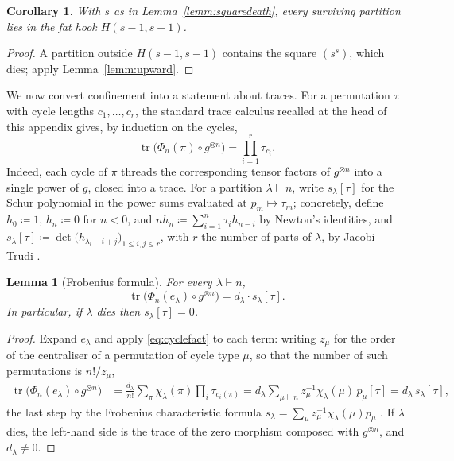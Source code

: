 \documentclass[11pt]{article}
\newtheorem{lemm}[theo]{Lemma}
\newtheorem{coro}[theo]{Corollary}
\newcommand{\tr}{\operatorname{tr}}
\newcommand{\hook}[2]{H(#1,#2)}                   %
\begin{document}
\begin{coro}\label{coro:hookconfine}
With $s$ as in Lemma~\ref{lemm:squaredeath}, every surviving
partition lies in the fat hook $\hook{s-1}{s-1}$.
\end{coro}

\begin{proof}
A partition outside $\hook{s-1}{s-1}$ contains the square
$(s^{s})$, which dies; apply Lemma~\ref{lemm:upward}.
\end{proof}

We now convert confinement into a statement about traces. For a
permutation $\pi$ with cycle lengths $c_{1},\dotsc,c_{r}$, the
standard trace calculus recalled at the head of this appendix
gives, by induction on the cycles,
\begin{equation}\label{eq:cyclefact}
\tr\bigl(\Phi_{n}(\pi)\circ g^{\otimes n}\bigr)
=\prod_{i=1}^{r}\tau_{c_{i}} .
\end{equation}
Indeed, each cycle of $\pi$ threads the corresponding tensor
factors of $g^{\otimes n}$ into a single power of $g$, closed
into a trace.
For a partition $\lambda\vdash n$, write $s_{\lambda}[\tau]$ for
the Schur polynomial in the power sums evaluated at
$p_{m}\mapsto\tau_{m}$; concretely, define
$h_{0}\coloneqq1$, $h_{n}\coloneqq0$ for $n<0$, and
$nh_{n}\coloneqq\sum_{i=1}^{n}\tau_{i}h_{n-i}$ by Newton's
identities, and
$s_{\lambda}[\tau]\coloneqq
\det\bigl(h_{\lambda_{i}-i+j}\bigr)_{1\le i,j\le r}$, with $r$
the number of parts of $\lambda$, by Jacobi--Trudi
\cite[Chapter~I]{Mac95}.

\begin{lemm}[Frobenius formula]\label{lemm:frobenius}
For every $\lambda\vdash n$,
\[
\tr\bigl(\Phi_{n}(e_{\lambda})\circ g^{\otimes n}\bigr)
=d_{\lambda}\cdot s_{\lambda}[\tau].
\]
In particular, if $\lambda$ dies then $s_{\lambda}[\tau]=0$.
\end{lemm}

\begin{proof}
Expand $e_{\lambda}$ and apply \eqref{eq:cyclefact} to each term:
writing $z_{\mu}$ for the order of the centraliser of a
permutation of cycle type $\mu$, so that the number of such
permutations is $n!/z_{\mu}$,
\begin{align*}
\tr\bigl(\Phi_{n}(e_{\lambda})\circ g^{\otimes n}\bigr)
&=\frac{d_{\lambda}}{n!}\sum_{\pi}\chi_{\lambda}(\pi)
  \prod_{i}\tau_{c_{i}(\pi)}
 =d_{\lambda}\sum_{\mu\vdash n}z_{\mu}^{-1}\chi_{\lambda}(\mu)\,
  p_{\mu}[\tau]
 =d_{\lambda}\,s_{\lambda}[\tau],
\end{align*}
the last step by the Frobenius characteristic formula
$s_{\lambda}=\sum_{\mu}z_{\mu}^{-1}\chi_{\lambda}(\mu)p_{\mu}$
\cite[I.7]{Mac95}. If $\lambda$ dies, the left-hand side is the
trace of the zero morphism composed with $g^{\otimes n}$, and
$d_{\lambda}\ne0$.
\end{proof}
\end{document}
